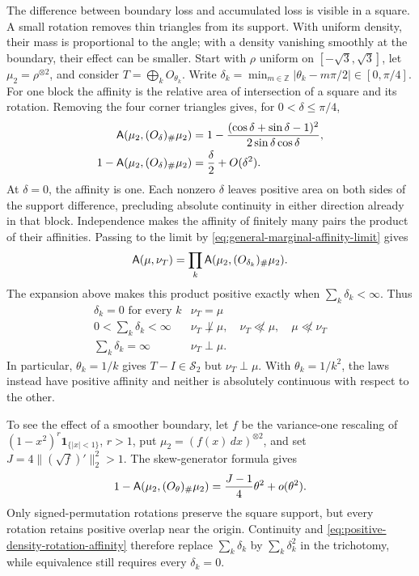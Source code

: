 The difference between boundary loss and accumulated loss is visible in a
square. A small rotation removes thin triangles from its support. With
uniform density, their mass is proportional to the angle; with a density
vanishing smoothly at the boundary, their effect can be smaller. Start
with \(\rho\) uniform on \([-\sqrt3,\sqrt3]\), let
\(\mu_2=\rho^{\otimes2}\), and consider
\(T=\bigoplus_kO_{\theta_k}\).
Write
\(\delta_k=\min_{m\in\mathbb Z}|\theta_k-m\pi/2|\in[0,\pi/4]\).
For one block the affinity is the relative area of intersection
of a square and its rotation.
Removing the four corner triangles gives, for \(0<\delta\leq\pi/4\),
\[
 \begin{aligned}
 \mathsf A(\mu_2,(O_\delta)_\#\mu_2)
 &=1-\frac{(\cos\delta+\sin\delta-1)^2}
                {2\sin\delta\cos\delta},\\
 1-\mathsf A(\mu_2,(O_\delta)_\#\mu_2)
 &=\frac{\delta}{2}+O(\delta^2).
 \end{aligned}
\]
At \(\delta=0\), the affinity is one. Each nonzero \(\delta\) leaves
positive area on both sides of the support difference, precluding absolute
continuity in either direction already in that block. Independence makes
the affinity of finitely many pairs the product of their affinities.
Passing to the limit by \eqref{eq:general-marginal-affinity-limit} gives
\[
 \mathsf A(\mu,\nu_T)
 =\prod_k\mathsf A(\mu_2,(O_{\delta_k})_\#\mu_2).
\]
The expansion above makes this product positive exactly when
\(\sum_k\delta_k<\infty\). Thus
\[
 \begin{array}{c|l}
  \delta_k=0\text{ for every }k&\nu_T=\mu\\
  0<\sum_k\delta_k<\infty&
      \nu_T\not\perp\mu,\quad \nu_T\not\ll\mu,\quad\mu\not\ll\nu_T\\
 \sum_k\delta_k=\infty&\nu_T\perp\mu.
 \end{array}
\]
In particular, \(\theta_k=1/k\) gives \(T-I\in\mathcal S_2\) but
\(\nu_T\perp\mu\).
With \(\theta_k=1/k^2\), the laws instead have positive affinity
and neither is absolutely continuous with respect to the other.

To see the effect of a smoother boundary, let \(f\) be the variance-one rescaling of
\((1-x^2)^r\mathbf1_{\{|x|<1\}}\), \(r>1\), put
\(\mu_2=(f(x)\,dx)^{\otimes2}\), and set
\(J=4\|(\sqrt f)'\|_2^2>1\).
The skew-generator formula gives
\begin{equation}
 1-\mathsf A(\mu_2,(O_\theta)_\#\mu_2)
       =\frac{J-1}{4}\theta^2+o(\theta^2).
 \label{eq:positive-density-rotation-affinity}
\end{equation}
Only signed-permutation rotations preserve the square support, but every
rotation retains positive overlap near the origin.  Continuity and
\eqref{eq:positive-density-rotation-affinity} therefore replace
\(\sum_k\delta_k\) by \(\sum_k\delta_k^2\) in the trichotomy, while equivalence
still requires every \(\delta_k=0\).

